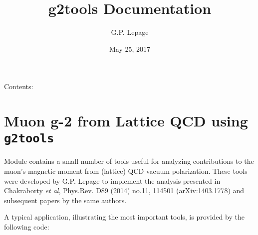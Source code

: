 \documentclass[letterpaper,10pt,english]{sphinxmanual}
\title{g2tools Documentation}
\date{May 25, 2017}
\author{G.P. Lepage}
\begin{document}
\maketitle
\tableofcontents
{}\label{index::doc}


Contents:


\chapter{Muon g-2 from Lattice QCD using \texttt{g2tools}}
\label{overview:g2tools-documentation}\label{overview:muon-g-2-from-lattice-qcd-using-g2tools}\label{overview::doc}
Module {\hyperref[g2tools:module-g2tools]{\emph{}}} contains a small number of tools useful for analyzing
contributions to the muon's magnetic moment from (lattice) QCD vacuum
polarization. These tools were developed by G.P. Lepage to implement the
analysis presented in Chakraborty \emph{et al}, Phys.Rev. D89 (2014) no.11, 114501
(arXiv:1403.1778) and subsequent papers by the same authors.

A typical application, illustrating the most important tools, is
provided by the following code:
\end{document}
